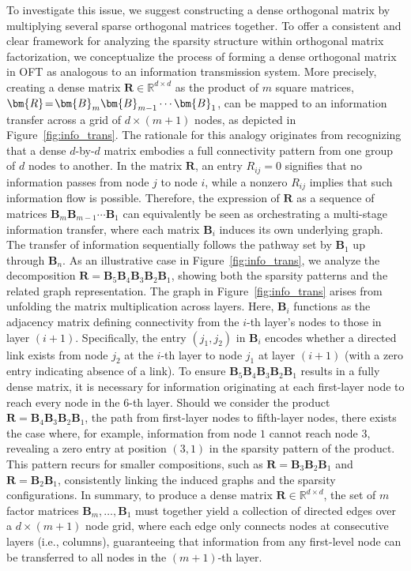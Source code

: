 To investigate this issue, we suggest constructing a dense orthogonal matrix by multiplying several sparse orthogonal matrices together. To offer a consistent and clear framework for analyzing the sparsity structure within orthogonal matrix factorization, we conceptualize the process of forming a dense orthogonal matrix in OFT as analogous to an information transmission system. More precisely, creating a dense matrix $\bm{R}\in\mathbb{R}^{d\times d}$ as the product of $m$ square matrices, $\thickmuskip=2mu \medmuskip=2mu \bm{R} = \bm{B}_m\bm{B}_{m-1}\cdots\bm{B}_1$, can be mapped to an information transfer across a grid of $d\times (m+1)$ nodes, as depicted in Figure~\ref{fig:info_trans}. The rationale for this analogy originates from recognizing that a dense $d$-by-$d$ matrix embodies a full connectivity pattern from one group of $d$ nodes to another. In the matrix $\bm{R}$, an entry $R_{ij} = 0$ signifies that no information passes from node $j$ to node $i$, while a nonzero $R_{ij}$ implies that such information flow is possible. Therefore, the expression of $\bm{R}$ as a sequence of matrices $\bm{B}_m\bm{B}_{m-1}\cdots\bm{B}_1$ can equivalently be seen as orchestrating a multi-stage information transfer, where each matrix $\bm{B}_i$ induces its own underlying graph. The transfer of information sequentially follows the pathway set by $\bm{B}_1$ up through $\bm{B}_n$. As an illustrative case in Figure~\ref{fig:info_trans}, we analyze the decomposition $\bm{R} = \bm{B}_5\bm{B}_4\bm{B}_3\bm{B}_2\bm{B}_1$, showing both the sparsity patterns and the related graph representation. The graph in Figure~\ref{fig:info_trans} arises from unfolding the matrix multiplication across layers. Here, $\bm{B}_i$ functions as the adjacency matrix defining connectivity from the $i$-th layer’s nodes to those in layer $(i+1)$. Specifically, the entry $(j_1, j_2)$ in $\bm{B}_i$ encodes whether a directed link exists from node $j_2$ at the $i$-th layer to node $j_1$ at layer $(i+1)$ (with a zero entry indicating absence of a link). To ensure $\bm{B}_5\bm{B}_4\bm{B}_3\bm{B}_2\bm{B}_1$ results in a fully dense matrix, it is necessary for information originating at each first-layer node to reach every node in the $6$-th layer. Should we consider the product $\bm{R} = \bm{B}_4\bm{B}_3\bm{B}_2\bm{B}_1$, the path from first-layer nodes to fifth-layer nodes, there exists the case where, for example, information from node $1$ cannot reach node $3$, revealing a zero entry at position $(3,1)$ in the sparsity pattern of the product. This pattern recurs for smaller compositions, such as $\bm{R} = \bm{B}_3\bm{B}_2\bm{B}_1$ and $\bm{R} = \bm{B}_2\bm{B}_1$, consistently linking the induced graphs and the sparsity configurations. In summary, to produce a dense matrix $\bm{R}\in\mathbb{R}^{d\times d}$, the set of $m$ factor matrices $\bm{B}_m,\ldots,\bm{B}_1$ must together yield a collection of directed edges over a $d \times (m+1)$ node grid, where each edge only connects nodes at consecutive layers (i.e., columns), guaranteeing that information from any first-level node can be transferred to all nodes in the $(m+1)$-th layer.

